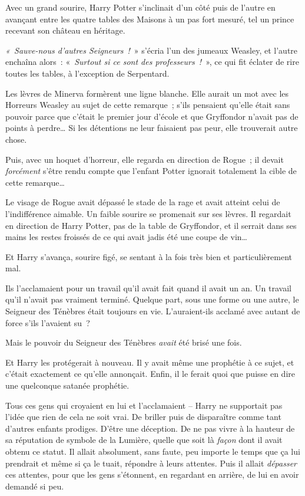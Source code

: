 Avec un grand sourire, Harry Potter s'inclinait d'un côté puis de l'autre en avançant entre les quatre tables des Maisons à un pas fort mesuré, tel un prince recevant son château en héritage.

\emph{«~Sauve-nous d'autres Seigneurs~!}~» s'écria l'un des jumeaux Weasley, et l'autre enchaîna alors~: «~\emph{Surtout si ce sont des professeurs~!}~», ce qui fit éclater de rire toutes les tables, à l'exception de Serpentard.

Les lèvres de Minerva formèrent une ligne blanche. Elle aurait un mot avec les Horreurs Weasley au sujet de cette remarque~; s'ils pensaient qu'elle était sans pouvoir parce que c'était le premier jour d'école et que Gryffondor n'avait pas de points à perdre… Si les détentions ne leur faisaient pas peur, elle trouverait autre chose.

Puis, avec un hoquet d'horreur, elle regarda en direction de Rogue~; il devait \emph{forcément} s'être rendu compte que l'enfant Potter ignorait totalement la cible de cette remarque…

Le visage de Rogue avait dépassé le stade de la rage et avait atteint celui de l'indifférence aimable. Un faible sourire se promenait sur ses lèvres. Il regardait en direction de Harry Potter, pas de la table de Gryffondor, et il serrait dans ses mains les restes froissés de ce qui avait jadis été une coupe de vin…

\later

Et Harry s'avança, sourire figé, se sentant à la fois très bien et particulièrement mal.

Ils l'acclamaient pour un travail qu'il avait fait quand il avait un an. Un travail qu'il n'avait pas vraiment terminé. Quelque part, sous une forme ou une autre, le Seigneur des Ténèbres était toujours en vie. L'auraient-ils acclamé avec autant de force s'ils l'avaient su~?

Mais le pouvoir du Seigneur des Ténèbres \emph{avait} été brisé une fois.

Et Harry les protégerait à nouveau. Il y avait même une prophétie à ce sujet, et c'était exactement ce qu'elle annonçait. Enfin, il le ferait quoi que puisse en dire une quelconque satanée prophétie.

Tous ces gens qui croyaient en lui et l'acclamaient -- Harry ne supportait pas l'idée que rien de cela ne soit vrai. De briller puis de disparaître comme tant d'autres enfants prodiges. D'être une déception. De ne pas vivre à la hauteur de sa réputation de symbole de la Lumière, quelle que soit là \emph{façon} dont il avait obtenu ce statut. Il allait absolument, sans faute, peu importe le temps que ça lui prendrait et même si ça le tuait, répondre à leurs attentes. Puis il allait \emph{dépasser} ces attentes, pour que les gens s'étonnent, en regardant en arrière, de lui en avoir demandé si peu.


